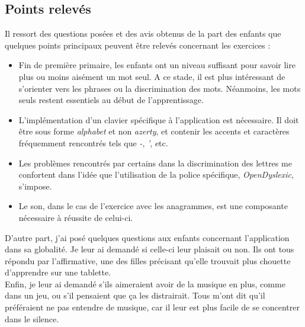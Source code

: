 \subsection{Points relevés \label{testPoints}}
Il ressort des questions posées et des avis obtenus de la part des enfants que quelques points principaux peuvent être relevés concernant les exercices :
\begin{itemize}
\item Fin de première primaire, les enfants ont un niveau suffisant pour savoir lire plus ou moins aisément un mot seul. A ce stade, il est plus intéressant de s'orienter vers les phrases ou la discrimination des mots. Néanmoins, les mots seuls restent essentiels au début de l'apprentissage.
\item L'implémentation d'un clavier spécifique à l'application est nécessaire. Il doit être sous forme \textit{alphabet} et non \textit{azerty}, et contenir les accents et caractères fréquemment rencontrés tels que \textit{-}, \textit{'}, etc.
\item Les problèmes rencontrés par certains dans la discrimination des lettres me confortent dans l'idée que l'utilisation de la police spécifique, \textit{OpenDyslexic}, s'impose.
\item Le son, dans le cas de l'exercice avec les anagrammes, est une composante nécessaire à réussite de celui-ci.\\
\end{itemize}

D'autre part, j'ai posé quelques questions aux enfants concernant l'application dans sa globalité. Je leur ai demandé si celle-ci leur plaisait ou non. Ils ont tous répondu par l'affirmative, une des filles précisant qu'elle trouvait plus chouette d'apprendre sur une tablette.\\
Enfin, je leur ai demandé s'ils aimeraient avoir de la musique en plus, comme dans un jeu, ou s'il pensaient que ça les distrairait. Tous m'ont dit qu'il préféraient ne pas entendre de musique, car il leur est plus facile de se concentrer dans le silence.